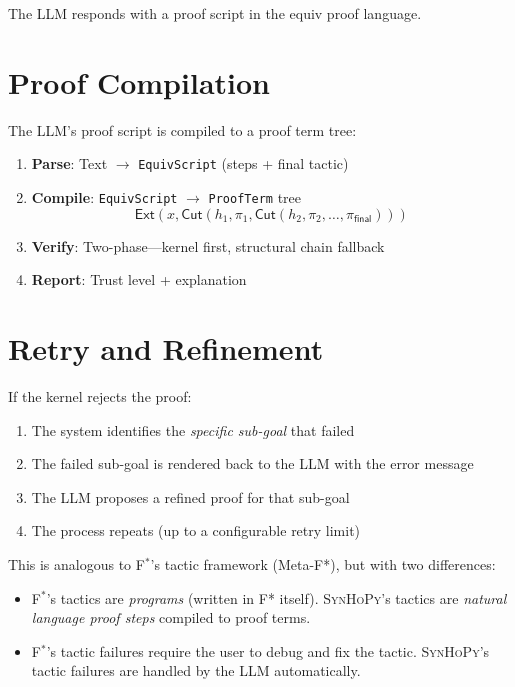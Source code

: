 \documentclass[11pt,a4paper]{report}
\theoremstyle{definition}
\theoremstyle{plain}
\newcommand{\Ext}{\mathsf{Ext}}
\newcommand{\Cut}{\mathsf{Cut}}
\newcommand{\fstar}{F$^{*}$}
\newcommand{\synhopy}{\textsc{SynHoPy}}
\begin{document}
The LLM responds with a proof script in the equiv proof language.

\section{Proof Compilation}

The LLM's proof script is compiled to a proof term tree:

\begin{enumerate}
  \item \textbf{Parse}: Text $\to$ \texttt{EquivScript} (steps + final tactic)
  \item \textbf{Compile}: \texttt{EquivScript} $\to$ \texttt{ProofTerm} tree
    \[
      \Ext(x, \Cut(h_1, \pi_1, \Cut(h_2, \pi_2, \ldots, \pi_{\mathsf{final}})))
    \]
  \item \textbf{Verify}: Two-phase---kernel first, structural chain fallback
  \item \textbf{Report}: Trust level + explanation
\end{enumerate}

\section{Retry and Refinement}

If the kernel rejects the proof:
\begin{enumerate}
  \item The system identifies the \emph{specific sub-goal} that failed
  \item The failed sub-goal is rendered back to the LLM with the error message
  \item The LLM proposes a refined proof for that sub-goal
  \item The process repeats (up to a configurable retry limit)
\end{enumerate}

This is analogous to \fstar{}'s tactic framework (Meta-F*), but with two
differences:
\begin{itemize}
  \item \fstar{}'s tactics are \emph{programs} (written in F* itself). \synhopy{}'s
    tactics are \emph{natural language proof steps} compiled to proof terms.
  \item \fstar{}'s tactic failures require the user to debug and fix the tactic.
    \synhopy{}'s tactic failures are handled by the LLM automatically.
\end{itemize}
\end{document}

